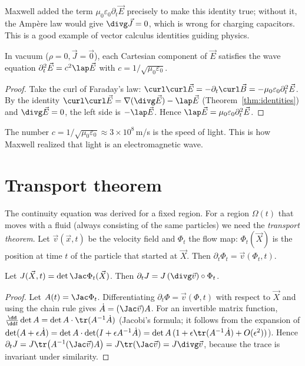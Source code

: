 \begin{remark}
Maxwell added the term $\mu_0\varepsilon_0\partial_t\vec E$ precisely to make this identity true; without it, the Amp\`ere law would give $\divg\vec J=0$, which is wrong for charging capacitors. This is a good example of vector calculus identities guiding physics.
\end{remark}

\begin{theorem}\label{thm:emwave}
In vacuum ($\rho=0,\vec J=\vec0$), each Cartesian component of $\vec E$ satisfies the wave equation $\partial_t^2\vec E=c^2\lap\vec E$ with $c=1/\sqrt{\mu_0\varepsilon_0}$.
\end{theorem}

\begin{proof}
Take the curl of Faraday's law: $\curl\curl\vec E=-\partial_t\curl\vec B=-\mu_0\varepsilon_0\partial_t^2\vec E$. By the identity $\curl\curl\vec E=\nabla(\divg\vec E)-\lap\vec E$ (Theorem~\ref{thm:identities}) and $\divg\vec E=0$, the left side is $-\lap\vec E$. Hence $\lap\vec E=\mu_0\varepsilon_0\partial_t^2\vec E$.
\end{proof}

The number $c=1/\sqrt{\mu_0\varepsilon_0}\approx3\times10^8\,$m/s is the speed of light. This is how Maxwell realized that light is an electromagnetic wave.

\section{Transport theorem}

The continuity equation was derived for a fixed region. For a region $\Omega(t)$ that moves with a fluid (always consisting of the same particles) we need the \emph{transport theorem}. Let $\vec v(\vec x,t)$ be the velocity field and $\Phi_t$ the flow map: $\Phi_t(\vec X)$ is the position at time $t$ of the particle that started at $\vec X$. Then $\partial_t\Phi_t=\vec v(\Phi_t,t)$.

\begin{lemma}\label{lem:euler}
Let $J(\vec X,t)=\det\Jac\Phi_t(\vec X)$. Then $\partial_tJ=J\,(\divg\vec v)\circ\Phi_t$.
\end{lemma}

\begin{proof}
Let $A(t)=\Jac\Phi_t$. Differentiating $\partial_t\Phi=\vec v(\Phi,t)$ with respect to $\vec X$ and using the chain rule gives $\dot A=(\Jac\vec v)A$. For an invertible matrix function, $\frac{\dd}{\dd t}\det A=\det A\cdot\tr(A^{-1}\dot A)$ (Jacobi's formula; it follows from the expansion of $\det(A+\epsilon\dot A)=\det A\cdot\det(I+\epsilon A^{-1}\dot A)=\det A\,(1+\epsilon\tr(A^{-1}\dot A)+O(\epsilon^2))$). Hence $\partial_tJ=J\tr\bigl(A^{-1}(\Jac\vec v)A\bigr)=J\tr(\Jac\vec v)=J\divg\vec v$, because the trace is invariant under similarity.
\end{proof}

